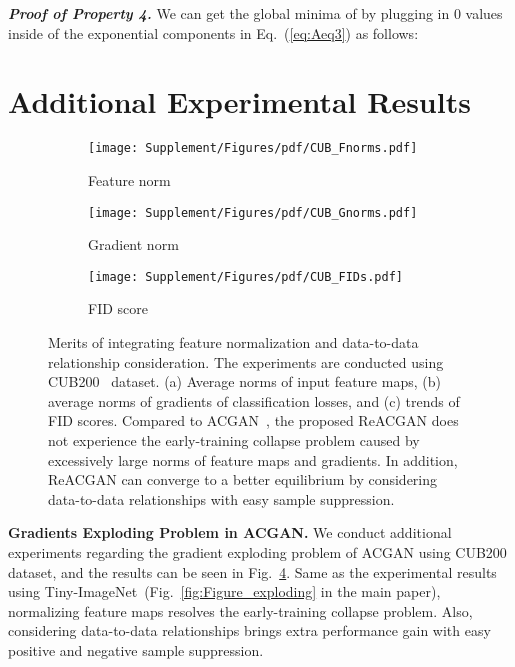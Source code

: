 \documentclass{article}
\begin{document}
\textbf{\textit{Proof of Property 4.}} We can get the global minima of  by plugging in 0 values inside of the exponential components in Eq.~(\ref{eq:Aeq3}) as follows:
 \section{Additional Experimental Results}
\label{additional_experiments}
\begin{figure}[t!]
    \centering
    \begin{subfigure}{0.32\textwidth}
    \texttt{[image: Supplement/Figures/pdf/CUB\_Fnorms.pdf]}
    \caption{Feature norm} \label{fig:acgan_fnorm_sp}
    \end{subfigure}
    \begin{subfigure}{0.32\textwidth}
    \texttt{[image: Supplement/Figures/pdf/CUB\_Gnorms.pdf]}
    \caption{Gradient norm} \label{fig:acgan_gnorm_sp}
    \end{subfigure}
    \begin{subfigure}{0.32\textwidth}
    \texttt{[image: Supplement/Figures/pdf/CUB\_FIDs.pdf]}
    \caption{FID score} \label{fig:acgan_fid_sp}
    \end{subfigure}
    \caption{Merits of integrating feature normalization and data-to-data relationship consideration. The experiments are conducted using CUB200~\cite{WelinderEtal2010} dataset. (a) Average norms of input feature maps, (b) average norms of gradients of classification losses, and (c) trends of FID scores. Compared to ACGAN~\cite{Odena2017ConditionalIS}, the proposed ReACGAN does not experience the early-training collapse problem caused by excessively large norms of feature maps and gradients. In addition, ReACGAN can converge to a better equilibrium by considering data-to-data relationships with easy sample suppression.}
    \label{fig:Figure_exploding_sp}
\end{figure} 
\textbf{Gradients Exploding Problem in ACGAN.} We conduct additional experiments regarding the gradient exploding problem of ACGAN using CUB200 dataset, and the results can be seen in Fig.~\ref{fig:Figure_exploding_sp}. Same as the experimental results using Tiny-ImageNet~(Fig.~\ref{fig:Figure_exploding} in the main paper), normalizing feature maps resolves the early-training collapse problem. Also, considering data-to-data relationships brings extra performance gain with easy positive and negative sample suppression.
\end{document}
